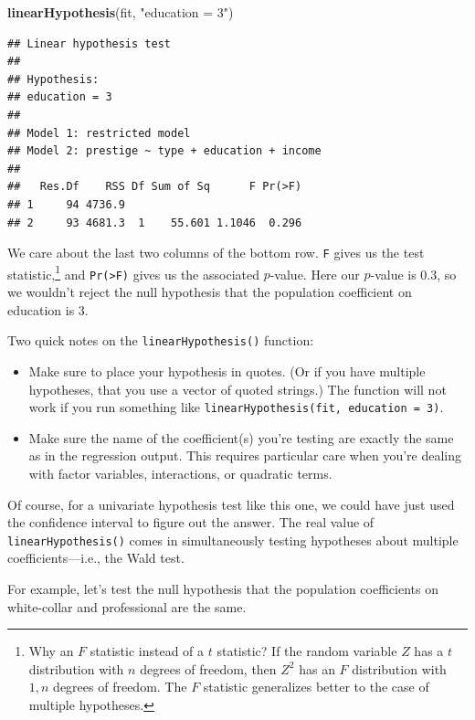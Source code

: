 \documentclass[12pt,oneside,openany]{book}
\newenvironment{Shaded}{\begin{snugshade}}{\end{snugshade}}
\newcommand{\KeywordTok}[1]{\textcolor[rgb]{0.13,0.29,0.53}{\textbf{#1}}}
\newcommand{\StringTok}[1]{\textcolor[rgb]{0.31,0.60,0.02}{#1}}
\newcommand{\NormalTok}[1]{#1}
\begin{document}
\begin{Shaded}
\begin{Highlighting}[]
\KeywordTok{linearHypothesis}\NormalTok{(fit, }\StringTok{"education = 3"}\NormalTok{)}
\end{Highlighting}
\end{Shaded}

\begin{verbatim}
## Linear hypothesis test
## 
## Hypothesis:
## education = 3
## 
## Model 1: restricted model
## Model 2: prestige ~ type + education + income
## 
##   Res.Df    RSS Df Sum of Sq      F Pr(>F)
## 1     94 4736.9                           
## 2     93 4681.3  1    55.601 1.1046  0.296
\end{verbatim}

We care about the last two columns of the bottom row. \texttt{F} gives
us the test statistic,\footnote{Why an \(F\) statistic instead of a
  \(t\) statistic? If the random variable \(Z\) has a \(t\) distribution
  with \(n\) degrees of freedom, then \(Z^2\) has an \(F\) distribution
  with \(1,n\) degrees of freedom. The \(F\) statistic generalizes
  better to the case of multiple hypotheses.} and
\texttt{Pr(\textgreater{}F)} gives us the associated \(p\)-value. Here
our \(p\)-value is 0.3, so we wouldn't reject the null hypothesis that
the population coefficient on education is 3.

Two quick notes on the \texttt{linearHypothesis()} function:

\begin{itemize}
\item
  Make sure to place your hypothesis in quotes. (Or if you have multiple
  hypotheses, that you use a vector of quoted strings.) The function
  will not work if you run something like
  \texttt{linearHypothesis(fit,\ education\ =\ 3)}.
\item
  Make sure the name of the coefficient(s) you're testing are exactly
  the same as in the regression output. This requires particular care
  when you're dealing with factor variables, interactions, or quadratic
  terms.
\end{itemize}

Of course, for a univariate hypothesis test like this one, we could have
just used the confidence interval to figure out the answer. The real
value of \texttt{linearHypothesis()} comes in simultaneously testing
hypotheses about multiple coefficients---i.e., the Wald test.

For example, let's test the null hypothesis that the population
coefficients on white-collar and professional are the same.
\end{document}
